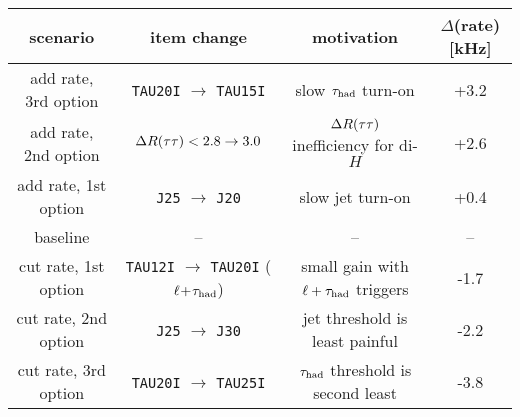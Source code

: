 \begin{tabular}{c|c|c|c}
  scenario       & item change   & motivation                        & $\Delta$(rate) [kHz] \\
  \hline\hline
  add rate, 3rd option & \texttt{TAU20I} $\rightarrow$ \texttt{TAU15I}                    & slow $\tau_\text{had}$ turn-on                        & +3.2 \\
  add rate, 2nd option & \texttt{$\Delta R(\tau\tau) < 2.8 \rightarrow 3.0$}               & $\Delta R(\tau\tau)$ inefficiency for di-$H$ & +2.6 \\
  add rate, 1st option & \texttt{J25} $\rightarrow$ \texttt{J20}                          & slow jet turn-on                            & +0.4 \\
  baseline             & --                                                               & --                                          & --   \\
  cut rate, 1st option & \texttt{TAU12I} $\rightarrow$ \texttt{TAU20I} ($\ell\!+\!\tau_\text{had}$) & small gain with $\ell+\tau_\text{had}$ triggers       & -1.7 \\
  cut rate, 2nd option & \texttt{J25} $\rightarrow$ \texttt{J30}                          & jet threshold is least painful              & -2.2 \\
  cut rate, 3rd option & \texttt{TAU20I} $\rightarrow$ \texttt{TAU25I}                    & $\tau_\text{had}$ threshold is second least           & -3.8 \\
  \hline\hline
\end{tabular}
